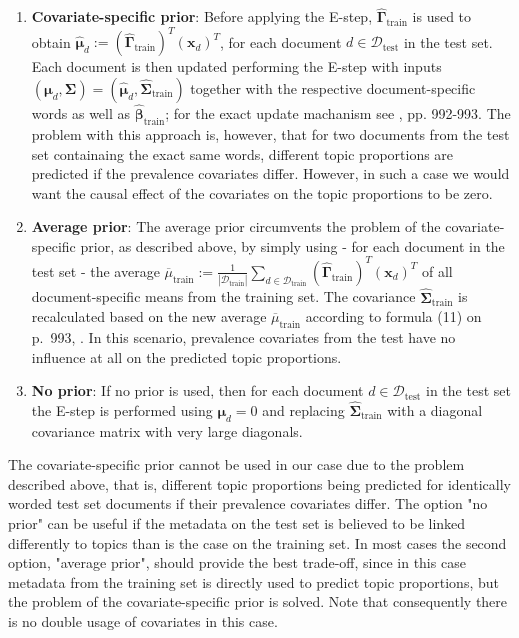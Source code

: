 \begin{enumerate}
\item \textbf{Covariate-specific prior}: Before applying the E-step, $\hat{\boldsymbol{\Gamma}}_{\text{train}}$ is used to obtain $\hat{\boldsymbol{\mu}}_d := (\hat{\boldsymbol{\Gamma}}_{\text{train}})^T(\boldsymbol{x}_d)^T$, for each document $d \in \mathcal{D}_{\text{test}}$ in the test set. Each document is then updated performing the E-step with inputs $(\boldsymbol{\mu}_d, \boldsymbol{\Sigma}) = (\hat{\boldsymbol{\mu}}_d, \hat{\boldsymbol{\Sigma}}_{\text{train}})$ together with the respective document-specific words as well as $\hat{\boldsymbol{\beta}}_{\text{train}}$; for the exact update machanism see \cite{roberts2013structural}, pp. 992-993. The problem with this approach is, however, that for two documents from the test set containaing the exact same words, different topic proportions are predicted if the prevalence covariates differ. However, in such a case we would want the causal effect of the covariates on the topic proportions to be zero.
\item \textbf{Average prior}: The average prior circumvents the problem of the covariate-specific prior, as described above, by simply using - for each document in the test set - the average $\overline{\mu}_{\text{train}} := \frac{1}{|\mathcal{D}_{\text{train}}|}\sum_{d \in \mathcal{D}_{\text{train}}} (\hat{\boldsymbol{\Gamma}}_{\text{train}})^T(\boldsymbol{x}_d)^T$ of all document-specific means from the training set. The covariance $\hat{\boldsymbol{\Sigma}}_{\text{train}}$ is recalculated based on the new average $\overline{\mu}_{\text{train}}$ according to formula (11) on p.\ 993, \cite{roberts2013structural}. In this scenario, prevalence covariates from the test have no influence at all on the predicted topic proportions. 
\item \textbf{No prior}: If no prior is used, then for each document $d \in \mathcal{D}_{\text{test}}$ in the test set the E-step is performed using $\boldsymbol{\mu}_d=0$ and replacing $\hat{\boldsymbol{\Sigma}}_{\text{train}}$ with a diagonal covariance matrix with very large diagonals.
\end{enumerate}
The covariate-specific prior cannot be used in our case due to the problem described above, that is, different topic proportions being predicted for identically worded test set documents if their prevalence covariates differ. The option "no prior" can be useful if the metadata on the test set is believed to be linked differently to topics than is the case on the training set. In most cases the second option, "average prior", should provide the best trade-off, since in this case metadata from the training set is directly used to predict topic proportions, but the problem of the covariate-specific prior is solved. Note that consequently there is no double usage of covariates in this case.

